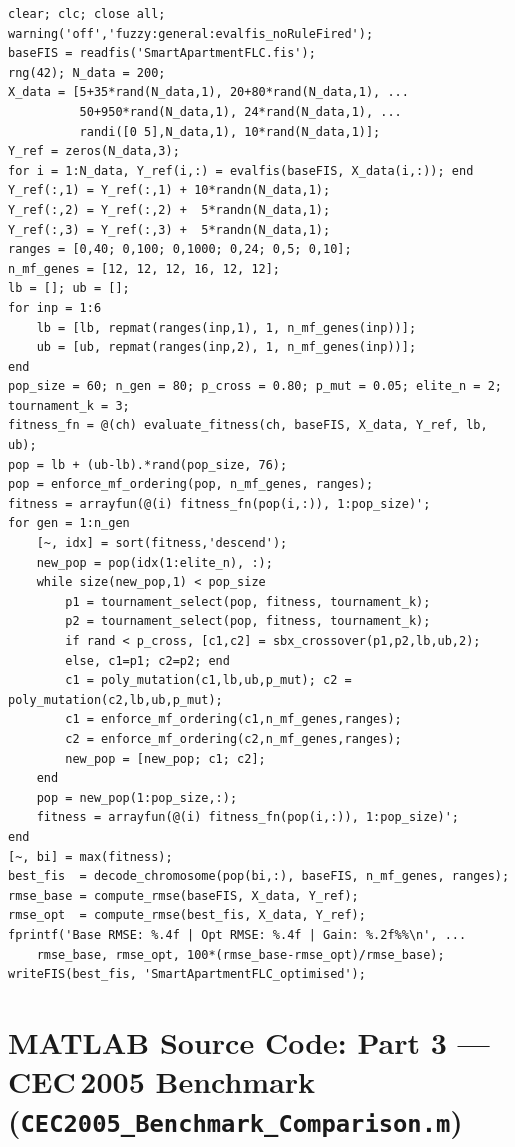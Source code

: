 \documentclass[10pt,twocolumn,a4paper]{article}
\begin{document}
\begin{lstlisting}[caption={Part 2: GA optimisation of FLC membership function breakpoints (key sections).}]
clear; clc; close all;
warning('off','fuzzy:general:evalfis_noRuleFired');
baseFIS = readfis('SmartApartmentFLC.fis');
rng(42); N_data = 200;
X_data = [5+35*rand(N_data,1), 20+80*rand(N_data,1), ...
          50+950*rand(N_data,1), 24*rand(N_data,1), ...
          randi([0 5],N_data,1), 10*rand(N_data,1)];
Y_ref = zeros(N_data,3);
for i = 1:N_data, Y_ref(i,:) = evalfis(baseFIS, X_data(i,:)); end
Y_ref(:,1) = Y_ref(:,1) + 10*randn(N_data,1);
Y_ref(:,2) = Y_ref(:,2) +  5*randn(N_data,1);
Y_ref(:,3) = Y_ref(:,3) +  5*randn(N_data,1);
ranges = [0,40; 0,100; 0,1000; 0,24; 0,5; 0,10];
n_mf_genes = [12, 12, 12, 16, 12, 12];
lb = []; ub = [];
for inp = 1:6
    lb = [lb, repmat(ranges(inp,1), 1, n_mf_genes(inp))];
    ub = [ub, repmat(ranges(inp,2), 1, n_mf_genes(inp))];
end
pop_size = 60; n_gen = 80; p_cross = 0.80; p_mut = 0.05; elite_n = 2; tournament_k = 3;
fitness_fn = @(ch) evaluate_fitness(ch, baseFIS, X_data, Y_ref, lb, ub);
pop = lb + (ub-lb).*rand(pop_size, 76);
pop = enforce_mf_ordering(pop, n_mf_genes, ranges);
fitness = arrayfun(@(i) fitness_fn(pop(i,:)), 1:pop_size)';
for gen = 1:n_gen
    [~, idx] = sort(fitness,'descend');
    new_pop = pop(idx(1:elite_n), :);
    while size(new_pop,1) < pop_size
        p1 = tournament_select(pop, fitness, tournament_k);
        p2 = tournament_select(pop, fitness, tournament_k);
        if rand < p_cross, [c1,c2] = sbx_crossover(p1,p2,lb,ub,2);
        else, c1=p1; c2=p2; end
        c1 = poly_mutation(c1,lb,ub,p_mut); c2 = poly_mutation(c2,lb,ub,p_mut);
        c1 = enforce_mf_ordering(c1,n_mf_genes,ranges);
        c2 = enforce_mf_ordering(c2,n_mf_genes,ranges);
        new_pop = [new_pop; c1; c2];
    end
    pop = new_pop(1:pop_size,:);
    fitness = arrayfun(@(i) fitness_fn(pop(i,:)), 1:pop_size)';
end
[~, bi] = max(fitness);
best_fis  = decode_chromosome(pop(bi,:), baseFIS, n_mf_genes, ranges);
rmse_base = compute_rmse(baseFIS, X_data, Y_ref);
rmse_opt  = compute_rmse(best_fis, X_data, Y_ref);
fprintf('Base RMSE: %.4f | Opt RMSE: %.4f | Gain: %.2f%%\n', ...
    rmse_base, rmse_opt, 100*(rmse_base-rmse_opt)/rmse_base);
writeFIS(best_fis, 'SmartApartmentFLC_optimised');
\end{lstlisting}

\section{MATLAB Source Code: Part 3 --- CEC\,2005 Benchmark (\texttt{CEC2005\_Benchmark\_Comparison.m})}
\label{app:part3}
\end{document}
